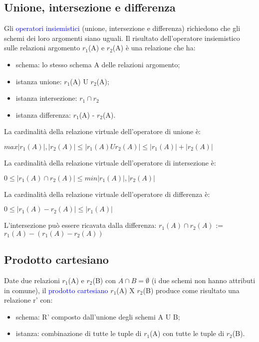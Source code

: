 \subsection{Unione, intersezione e differenza}
\label{Op ins}
Gli \textcolor{blue}{operatori insiemistici} (unione, intersezione e differenza) richiedono che gli schemi dei loro argomenti siano uguali.
Il risultato dell’operatore insiemistico sulle relazioni argomento $r_1$(A) e $r_2$(A) è una relazione che ha:
\begin{itemize}
    \item schema: lo stesso schema A delle relazioni argomento;
    \item istanza unione: $r_1$(A) U $r_2$(A);
    \item istanza intersezione: $r_1 \cap r_2$
    \item istanza differenza: $r_1$(A) - $r_2$(A).
\end{itemize}

La cardinalità della relazione virtuale dell'operatore di unione è:

$max{|r_1(A)|,|r_2(A)|} \leq |r_1(A) U r_2(A)| \leq |r_1(A)|+|r_2(A)|$

La cardinalità della relazione virtuale dell'operatore di intersezione è:

$0 \leq |r_1(A) \cap r_2(A)| \leq min{|r_1(A)|,|r_2(A)|}$

La cardinalità della relazione virtuale dell'operatore di differenza è:

$0 \leq |r_1(A) - r_2(A)| \leq |r_1(A)|$

L'intersezione può essere ricavata dalla differenza: $r_1(A) \cap r_2(A)$ := $r_1(A) - (r_1(A) - r_2(A))$

\subsection{Prodotto cartesiano}

Date due relazioni $r_1$(A) e $r_2$(B) con $A \cap B = \emptyset$ (i due schemi non hanno attributi in comune), il \textcolor{blue}{prodotto cartesiano} $r_1$(A) X $r_2$(B) produce come risultato una relazione r' con:
\begin{itemize}
    \item schema: R' composto dall’unione degli schemi A U B;
    \item istanza: combinazione di tutte le tuple di $r_1$(A) con tutte le tuple di $r_2$(B).
\end{itemize}

